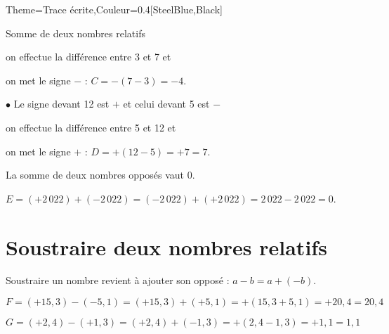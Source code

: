 \begin{Maquette}[Cours]{Theme={Trace écrite},Couleur={0.4[SteelBlue,Black]}}
\begin{methode*}{Somme de deux nombres relatifs}
\begin{exbmethode}
\begin{multicols}{2}
                  on effectue la différence entre 3 et 7 et \par
                  on met le signe $-$ : $C =-(7-3) =-4$. \par
                  $\bullet$ Le signe devant 12 est $+$ et celui devant 5 est $-$ \par
                  on effectue la différence entre 5 et 12 et \par
                  on met le signe $+$ : $D =+(12-5) =+7 =7$. 
               \end{multicols}
         \end{exbmethode}
      \end{methode*}

      \begin{propriete*}{}
         La somme de deux nombres opposés vaut 0.
      \end{propriete*}

      \begin{exemple*}{}
         $E =(+2\,022)+(-2\,022) =(-2\,022)+(+2\,022) =2\,022-2\,022 =0$.
      \end{exemple*}

   \section{Soustraire deux nombres relatifs}

      \begin{propriete*}{}
         Soustraire un nombre revient à ajouter son opposé : $a-b=a+(-b)$.
      \end{propriete*}

      \begin{exemple*}{}
         $F =(+15,3)-(-5,1) =(+15,3)+(+5,1) =+(15,3+5,1) =+20,4 =20,4$ \par
         $G =(+2,4)-(+1,3)=(+2,4)+(-1,3) =+(2,4-1,3) =+1,1 =1,1$
      \end{exemple*}



\end{Maquette}
